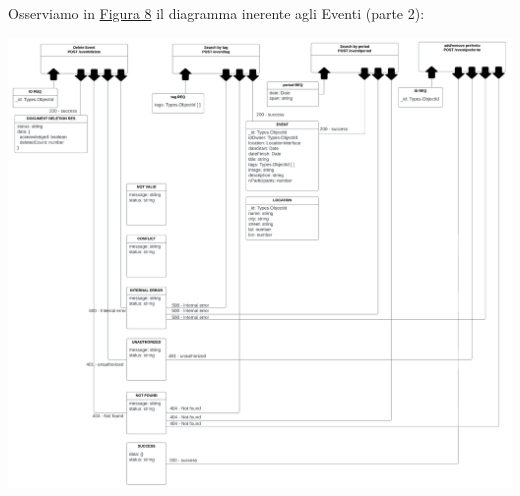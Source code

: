 \documentclass{article}
\begin{document}
\begin{description}
\begin{center}
        \end{center}
        \clearpage
    \item[] Osserviamo in \hyperref[img:8]{Figura 8} il diagramma inerente agli Eventi (parte 2):
    \item[] \label{img:8} \begin{center}
            \includegraphics[scale=0.9]{eventResources2.png}
        \end{center}
\end{description}
\clearpage
\end{document}
